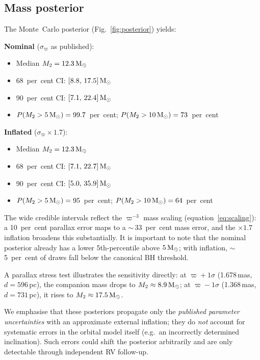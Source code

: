\documentclass[usenatbib,fleqn]{mnras}
\newcommand{\Msun}{{\rm M}_\odot}
\begin{document}
\subsection{Mass posterior}
\label{sec:results:posterior}

The Monte~Carlo posterior (Fig.~\ref{fig:posterior}) yields:

\medskip
\noindent\textbf{Nominal} ($\sigma_\varpi$ as published):
\begin{itemize}
\item Median $M_2 = 12.3\,\Msun$
\item 68~per~cent CI: $[8.8,\,17.5]\,\Msun$
\item 90~per~cent CI: $[7.1,\,22.4]\,\Msun$
\item $P(M_2 > 5\,\Msun) = 99.7$~per~cent;
  $P(M_2 > 10\,\Msun) = 73$~per~cent
\end{itemize}

\medskip
\noindent\textbf{Inflated} ($\sigma_\varpi \times 1.7$):
\begin{itemize}
\item Median $M_2 = 12.3\,\Msun$
\item 68~per~cent CI: $[7.1,\,22.7]\,\Msun$
\item 90~per~cent CI: $[5.0,\,35.9]\,\Msun$
\item $P(M_2 > 5\,\Msun) = 95$~per~cent;
  $P(M_2 > 10\,\Msun) = 64$~per~cent
\end{itemize}

\medskip
The wide credible intervals reflect the $\varpi^{-3}$ mass
scaling (equation~\ref{eq:scaling}): a 10~per~cent parallax
error maps to a $\sim$\,33~per~cent mass error, and the
$\times 1.7$ inflation broadens this substantially.  It is
important to note that the nominal posterior already has a
lower 5th-percentile above $5\,\Msun$; with inflation,
$\sim$\,5~per~cent of draws fall below the canonical BH
threshold.

A parallax stress test illustrates the sensitivity directly:
at $\varpi + 1\sigma$ (1.678\,mas, $d = 596$\,pc), the
companion mass drops to $M_2 \approx 8.9\,\Msun$; at
$\varpi - 1\sigma$ (1.368\,mas, $d = 731$\,pc), it rises to
$M_2 \approx 17.5\,\Msun$.

We emphasise that these posteriors propagate only the
\emph{published parameter uncertainties} with an approximate
external inflation; they do \emph{not} account for systematic
errors in the orbital model itself (e.g.\ an incorrectly
determined inclination).  Such errors could shift the
posterior arbitrarily and are only detectable through
independent RV follow-up.
\end{document}
